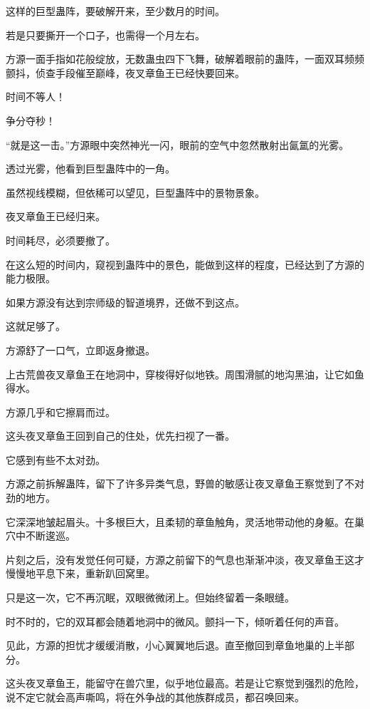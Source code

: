 
\begin{this_body}



这样的巨型蛊阵，要破解开来，至少数月的时间。

若是只要撕开一个口子，也需得一个月左右。

方源一面手指如花般绽放，无数蛊虫四下飞舞，破解着眼前的蛊阵，一面双耳频频颤抖，侦查手段催至巅峰，夜叉章鱼王已经快要回来。

时间不等人！

争分夺秒！

“就是这一击。”方源眼中突然神光一闪，眼前的空气中忽然散射出氤氲的光雾。

透过光雾，他看到巨型蛊阵中的一角。

虽然视线模糊，但依稀可以望见，巨型蛊阵中的景物景象。

夜叉章鱼王已经归来。

时间耗尽，必须要撤了。

在这么短的时间内，窥视到蛊阵中的景色，能做到这样的程度，已经达到了方源的能力极限。

如果方源没有达到宗师级的智道境界，还做不到这点。

这就足够了。

方源舒了一口气，立即返身撤退。

上古荒兽夜叉章鱼王在地洞中，穿梭得好似地铁。周围滑腻的地沟黑油，让它如鱼得水。

方源几乎和它擦肩而过。

这头夜叉章鱼王回到自己的住处，优先扫视了一番。

它感到有些不太对劲。

方源之前拆解蛊阵，留下了许多异类气息，野兽的敏感让夜叉章鱼王察觉到了不对劲的地方。

它深深地皱起眉头。十多根巨大，且柔韧的章鱼触角，灵活地带动他的身躯。在巢穴中不断逡巡。

片刻之后，没有发觉任何可疑，方源之前留下的气息也渐渐冲淡，夜叉章鱼王这才慢慢地平息下来，重新趴回窝里。

只是这一次，它不再沉眠，双眼微微闭上。但始终留着一条眼缝。

时不时的，它的双耳都会随着地洞中的微风。颤抖一下，倾听着任何的声音。

见此，方源的担忧才缓缓消散，小心翼翼地后退。直至撤回到章鱼地巢的上半部分。

这头夜叉章鱼王，能留守在兽穴里，似乎地位最高。若是让它察觉到强烈的危险，说不定它就会高声嘶鸣，将在外争战的其他族群成员，都召唤回来。


\end{this_body}
